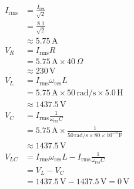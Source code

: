 \documentclass[journal,12pt,twocolumn]{IEEEtran}
\begin{document}
\begin{enumerate}
\begin{align}
    I_{\text{rms}} & = \frac{I_{\text{res}}}{\sqrt{2}} \\
    & = \frac{8.1}{\sqrt{2}} \\
    & \approx 5.75 \, \text{A}\\
    V_R & = I_{\text{rms}}   R \\
    & = 5.75 \, \text{A} \times 40 \, \Omega \\
    & \approx 230 \, \text{V} \\
    V_L & = I_{\text{rms}}   \omega_{\text{res}} L \\
    & = 5.75 \, \text{A} \times 50 \, \text{rad/s} \times 5.0 \, \text{H} \\
    & \approx 1437.5 \, \text{V}  \\
    V_C & = I_{\text{rms}}   \frac{1}{\omega_{\text{res}} C} \\
    & = 5.75 \, \text{A} \times \frac{1}{50 \, \text{rad/s} \times 80 \times 10^{-6} \, \text{F}} \\
    & \approx 1437.5 \, \text{V} \\
    V_{LC} & = I_{\text{rms}}   \omega_{\text{res}} L - I_{\text{rms}}   \frac{1}{\omega_{\text{res}} C} \\
    & = V_L - V_C \\
    & = 1437.5 \, \text{V} - 1437.5 \, \text{V} = 0 \, \text{V}
\end{align}
\end{enumerate}
\end{document}
